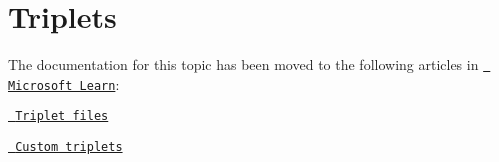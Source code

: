 \chapter{Triplets}
\hypertarget{md_external_2reflect-cpp_2vcpkg_2docs_2users_2triplets}{}\label{md_external_2reflect-cpp_2vcpkg_2docs_2users_2triplets}
\label{md_external_2reflect-cpp_2vcpkg_2docs_2users_2triplets_autotoc_md761}%
%


The documentation for this topic has been moved to the following articles in \href{https://learn.microsoft.com/vcpkg}{\texttt{ Microsoft Learn}}\+:


\begin{DoxyItemize}
\item \href{https://learn.microsoft.com/vcpkg/users/triplets}{\texttt{ Triplet files}}
\item \href{https://learn.microsoft.com/en-us/vcpkg/users/examples/overlay-triplets-linux-dynamic}{\texttt{ Custom triplets}} 
\end{DoxyItemize}